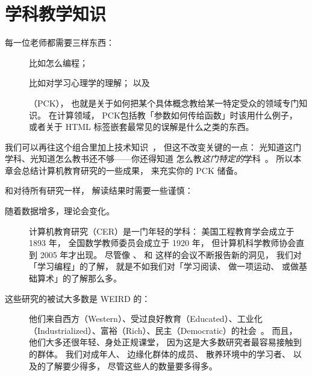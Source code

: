 \chapter{学科教学知识}\label{s:pck}

每一位老师都需要三样东西：

\begin{description}

\item[]
  比如怎么编程；

\item[]
  比如对学习心理学的理解；
  以及

\item[]
  （PCK），
  也就是关于如何把某个具体概念教给某一特定受众的领域专门知识。
  在计算领域，
  PCK包括教「参数如何传给函数」时该用什么例子，
  或者关于 HTML 标签嵌套最常见的误解是什么之类的东西。

\end{description}

我们可以再往这个组合里加上技术知识~\cite{Koeh2013}，
但这不改变关键的一点：
光知道这门学科、光知道怎么教书还不够——你还得知道
怎么教\emph{这门特定的}学科~\cite{Maye2004}。
所以本章会总结计算机教育研究的一些成果，
来充实你的 PCK 储备。

和对待所有研究一样，
解读结果时需要一些谨慎：

\begin{description}

\item[随着数据增多，理论会变化。]
  计算机教育研究（CER）是一门年轻的学科：
  美国工程教育学会成立于 1893 年，
  全国数学教师委员会成立于 1920 年，
  但计算机科学教师协会直到 2005 年才出现。
  尽管像 、
  和  这样的会议不断报告新的洞见，
  我们对「学习编程」的了解，
  就是不如我们对「学习阅读、
  做一项运动、
  或做基础算术」的了解那么多。

\item[这些研究的被试大多数是 WEIRD 的：]
  他们来自西方（Western）、受过良好教育（Educated）、工业化（Industrialized）、富裕（Rich）、民主（Democratic）的社会~\cite{Henr2010}。
  而且，
  他们大多还很年轻、身处正规课堂，
  因为这是大多数研究者最容易接触到的群体。
  我们对成年人、
  边缘化群体的成员、
  散养环境中的学习者、
  以及的了解要少得多，
  尽管这些人的数量要多得多。

\end{description}

